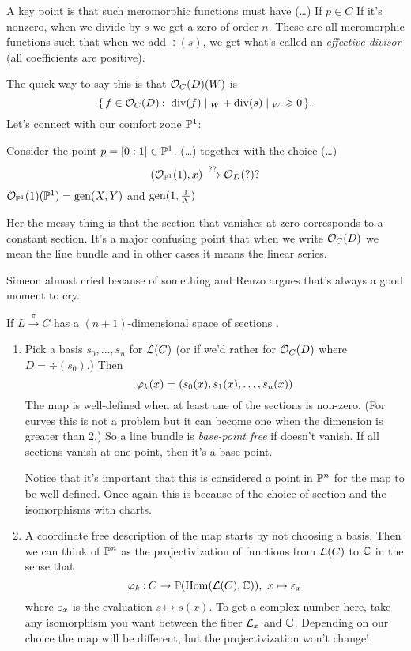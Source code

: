 \documentclass[12pt]{memoir}
\begin{document}
A key point is that such meromorphic functions must have (\dots) If $p\in C$ If it's nonzero, when we divide by $s$ we get a zero of order $n$. These are all meromorphic functions such that when we add $\div(s)$, we get what's called an \emph{effective divisor} (all coefficients are positive).\par
The quick way to say this is that $\mathcal{O}_C(D)(W)$ is 
$$\set{f\in\cO_C(D)\:\ \div(f)\mid_{W}+\div(s)\mid_W\geq 0}.$$
Let's connect with our comfort zone $\mathbb{P}^1$:

\begin{Ex}
    Consider the point $p=[0:1]\in\mathbb{P}^1$. (\dots) together with the choice (\dots)  
    $$(\mathcal{O}_{\mathbb{P}^1}(1),x)\xrightarrow{??}\mathcal{O}_D(?)?$$
    $\mathcal{O}_{\mathbb{P}^1}(1)(\mathbb{P}^1)=\operatorname{gen}(X,Y)$ and $\operatorname{gen}(1,\frac{1}{X})$ 
\end{Ex}

Her the messy thing is that the section that vanishes at zero corresponds to a constant section. It's a major confusing point that when we write $\mathcal{O}_C(D)$ we mean the line bundle and in other cases it means the linear series. 

\begin{Rmk}
    Simeon almost cried because of something and Renzo argues that's always a good moment to cry.
\end{Rmk}

If $L\xrightarrow{\pi}C$ has a $(n+1)$-dimensional space of sections .

\begin{enumerate}
    \item Pick a basis $s_0,\dots,s_n$ for $\mathcal{L}(C)$ (or if we'd rather for $\mathcal{O}_C(D)$ where $D=\div(s_0)$.) Then 
    $$\varphi_k(x)=(s_0(x),s_1(x),\dots,s_n(x))$$
    The map is well-defined when at least one of the sections is non-zero. (For curves this is not a problem but it can become one when the dimension is greater than 2.) So a line bundle is \emph{base-point free} if  doesn't vanish. If all sections vanish at one point, then it's a base point.\par
    Notice that it's important that this is considered a point in $\mathbb{P}^n$ for the map to be well-defined. Once again this is because of the choice of section and the isomorphisms with charts. 
    \item A coordinate free description of the map starts by not choosing a basis. Then we can think of $\mathbb{P}^n$ as the projectivization of functions from $\mathcal{L}(C)$ to $\mathbb{C}$ in the sense that
    $$\varphi_k\mathbin{:} C\to\mathbb{P}(\operatorname{Hom}(\mathcal{L}(C),\mathbb{C})),\ x\mapsto \varepsilon_x$$
    where $\varepsilon_x$ is the evaluation $s\mapsto s(x)$. To get a complex number here, take any isomorphism you want between the fiber $\mathcal{L}_x$ and $\mathbb{C}$. Depending on our choice the map will be different, but the projectivization won't change!
\end{enumerate}
\end{document}
